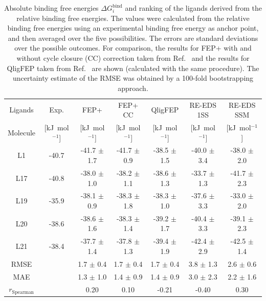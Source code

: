 \begin{table}[h]
\caption{Absolute binding free energies $\Delta G_{i}^{\text{bind}}$ and ranking of the ligands derived from the relative binding free energies. The values were calculated from the relative binding free energies using an experimental binding free energy as anchor point, and then averaged over the five possibilities. The errors are standard deviations over the possible outcomes. For comparison, the results for FEP+ with and without cycle closure (CC) correction taken from Ref.~\cite{Wang2017} and the results for QligFEP taken from Ref.~\cite{Jespers2019} are shown (calculated with the same procedure). The uncertainty estimate of the RMSE was obtained by a 100-fold bootstrapping approach.}
\begin{center}
\footnotesize
\begin{adjustbox}{max width=\textwidth}
\begin{tabular}{ c |c |c|c|c|c|c}
  Ligands & \multicolumn{1}{c|}{Exp. \cite{Huang2012}} &\multicolumn{1}{c|}{FEP+ \cite{Wang2017}}&\multicolumn{1}{c|}{FEP+ CC \cite{Wang2017}}&\multicolumn{1}{c|}{QligFEP \cite{Jespers2019}}&\multicolumn{1}{c|}{RE-EDS 1SS}&\multicolumn{1}{c}{RE-EDS SSM}\\ 
    Molecule & [kJ~mol$^{-1}$]  & [kJ~mol$^{-1}$] & [kJ~mol$^{-1}$] & [kJ~mol$^{-1}$] & [kJ~mol$^{-1}$] & [kJ~mol$^{-1}$]  \\
  \hline
        L1 &   -40.7 & -41.7 $\pm$ 1.7         & -41.7 $\pm$ 0.9         & -38.5 $\pm$ 1.5 &   -40.0 $\pm$ 3.4 &    -38.0 $\pm$ 2.0 \\
        L17 &  -40.8 &  -38.0 $\pm$ 1.0         & -38.2 $\pm$ 1.1         & -38.6 $\pm$ 1.3 &    -33.7 $\pm$ 1.3 & -41.7 $\pm$ 2.3 \\
        L19 &  -35.9  & -38.1 $\pm$ 0.9         & -38.3 $\pm$ 1.8         & -38.3 $\pm$ 1.0 &   -37.6 $\pm$ 3.3 &  -33.0 $\pm$ 2.0 \\
        L20 &  -38.6 & -38.6  $\pm$ 1.6         & -38.3 $\pm$ 1.4         & -39.2 $\pm$ 1.7 &    -40.4 $\pm$ 3.3 & -39.1 $\pm$ 2.3 \\
        L21 &  -38.4 & -37.7  $\pm$ 1.4         & -37.8 $\pm$ 1.3         & -39.4 $\pm$ 1.9 &    -42.4 $\pm$ 2.9 &    -42.5 $\pm$ 1.4 \\
    \hline
        RMSE &                    & 1.7  $\pm$  0.4        & 1.7   $\pm$ 0.4        & 1.7 $\pm$ 0.4          & 3.8 $\pm$ 1.3         & 2.6 $\pm$ 0.6 \\
        MAE &                     & 1.3 $\pm$ 1.0  & 1.4 $\pm$ 0.9 & 1.4 $\pm$ 0.9 & 3.0 $\pm$ 2.3 & 2.2 $\pm$ 1.6 \\
        $r_{\text{Spearman}}$ &  & 0.20           & 0.10          & -0.21         &  -0.40           & 0.30 \\
\end{tabular}
\end{adjustbox}
\end{center}
\label{tab:RE-EDS_FE_RingCycleOpening_absoluteShiftDF}
\end{table}

\FloatBarrier
\clearpage